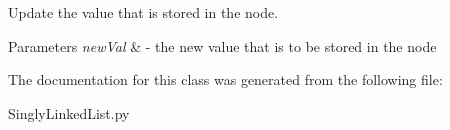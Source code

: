 Update the value that is stored in the node. 


\begin{DoxyParams}{Parameters}
{\em new\+Val} & -\/ the new value that is to be stored in the node \\
\hline
\end{DoxyParams}


The documentation for this class was generated from the following file\+:\begin{DoxyCompactItemize}
\item 
Singly\+Linked\+List.\+py\end{DoxyCompactItemize}

